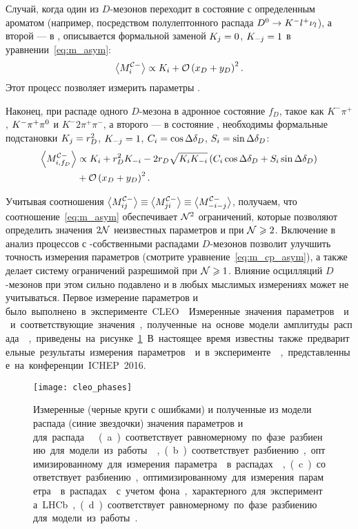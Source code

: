 Случай, когда один из $D$-мезонов переходит в состояние с определенным ароматом (например, посредством полулептонного распада $D^0\to K^-l^+\nu_l$), а второй --- в \kspp, описывается формальной заменой $K_j = 0$, $K_{-j} = 1$ в уравнении~\eqref{eq:m_asym}:
\begin{equation}\label{eq:m_flv_asym}
 \left<M^{\mathcal{C}-}_{i}\right> \propto K_i + \mathcal{O}\left(x_D+y_D\right)^2.
\end{equation}
Этот процесс позволяет измерить параметры \ki.

Наконец, при распаде одного $D$-мезона в адронное состояние $f_D$, такое как $K^-\pi^+$, $K^-\pi^+\pi^0$ и $K^-2\pi^+\pi^-$, а второго --- в состояние \kspp, необходимы формальные подстановки $K_j = r_D^2$, $K_{-j} = 1$, $C_i = \cos\Delta\delta_D$, $S_i = \sin\Delta\delta_D$:
\begin{equation}\label{eq:m_kpi_asym}
\begin{split}
 \left<M^{\mathcal{C}-}_{i,f_D}\right> & \propto K_i + r_D^2K_{-i} -2r_D\sqrt{K_iK_{-i}}\left(C_i\cos\Delta\delta_D + S_i\sin\Delta\delta_D\right)\\
                                  & + \mathcal{O}\left(x_D+y_D\right)^2.
\end{split}
\end{equation}

Учитывая соотношения $\left<M^{\mathcal{C}-}_{ij}\right>\equiv \left<M^{\mathcal{C}-}_{ji}\right>\equiv \left<M^{\mathcal{C}-}_{-i-j}\right>$, получаем, что соотношение~\eqref{eq:m_asym} обеспечивает $\mathcal{N}^2$ ограничений, которые позволяют определить значения $2\mathcal{N}$ неизвестных параметров \ci и \si при $\mathcal{N}\geqslant 2$.  Включение в анализ процессов с \cpconj-собственными распадами $D$-мезонов позволит улучшить точность измерения параметров \ci (смотрите уравнение~\eqref{eq:m_cp_asym}), а также делает систему ограничений разрешимой при $\mathcal{N}\geqslant 1$.  Влияние осцилляций $D$-мезонов при этом сильно подавлено и в любых мыслимых измерениях может не учитываться.  Первое измерение параметров \ci и \si было выполнено в эксперименте CLEO~\cite{CLEO_phases}.  
Измеренные значения параметров \ci и \si и соответствующие значения, полученные на основе модели амплитуды распада \dnkpp, приведены на рисунке~\ref{fig:cleo_phases}.  В настоящее время известны также предварительные результаты измерения параметров \ci и \si в эксперименте \besiii, представленные на конференции ICHEP 2016.

\begin{figure}[H]
 \centering
  \texttt{[image: cleo\_phases]}
 \caption{Измеренные (черные круги с ошибками) и полученные из модели распада (синие звездочки) значения  параметров \ci и \si для распада \dnkpp~\cite{CLEO_phases}. (a) соответствует равномерному по фазе разбиению для модели из работы~\cite{babar_gamma_dalitz_model}, (b) соответствует разбиению, оптимизированному для измерения параметра \gphi в распадах \bdk, (c) соответствует разбиению, оптимизированному для измерения параметра \gphi в распадах \bdk с учетом фона, характерного для эксперимента LHCb, (d) соответствует равномерному по фазе разбиению для модели из работы~\cite{belle_gamma_dalitz_model}.}
 \label{fig:cleo_phases}
\end{figure}

